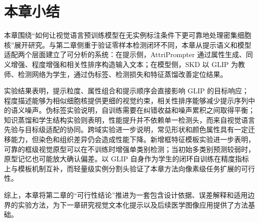 \section{本章小结}

本章围绕“如何让视觉语言预训练模型在无实例标注条件下更可靠地处理密集细胞核”展开研究。与第二章侧重于验证零样本检测闭环不同，本章从提示语义和模型适配两个层面建立了可分析的系统：在提示侧，AttriPrompter 通过属性生成、同义增强、程度增强和相关性排序构造输入文本；在模型侧，SKD 以 GLIP 为教师、检测网络为学生，通过伪标签、检测损失和特征蒸馏改善定位结果。

实验结果表明，提示粒度、属性组合和提示顺序会直接影响 GLIP 的目标响应；程度描述能够为相似细胞核提供更细的视觉约束，相关性排序能够减少提示序列中的语义噪声。伪标签实验说明，自训练需要在纠错收益和噪声累积之间取得平衡；知识蒸馏和学生结构实验则表明，性能提升并不依赖单一检测头，而来自视觉语言先验与目标级适配的协同。跨域实验进一步说明，常见形状和颜色属性具有一定迁移能力，但染色和组织差异仍会造成性能下降。新增框特征模板实验进一步表明，可靠的框级视觉原型可以在不训练时增强单类别检测；当初始多类别预测较弱时，原型记忆也可能放大确认偏差。以 GLIP 自身作为学生的闭环自训练在精度指标上与模板机制互补，而轻量级实例分割头验证了本章方法向像素级任务扩展的可行性。

综上，本章将第二章的“可行性结论”推进为一套包含设计依据、误差解释和适用边界的实验方法，为下一章研究视觉文本化提示以及后续医学图像应用提供了方法基础。
